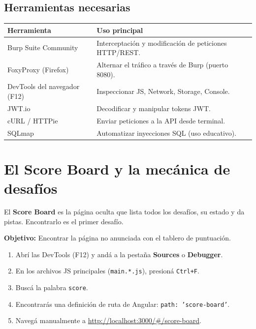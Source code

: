\documentclass[11pt,a4paper]{article}
\begin{document}
\subsection{Herramientas necesarias}
\begin{center}
\renewcommand{\arraystretch}{1.3}
\begin{tabularx}{\textwidth}{@{} p{3.5cm} X @{}}
\toprule
\textbf{Herramienta} & \textbf{Uso principal} \\
\midrule
Burp Suite Community & Interceptación y modificación de peticiones HTTP/REST. \\
FoxyProxy (Firefox) & Alternar el tráfico a través de Burp (puerto 8080). \\
DevTools del navegador (F12) & Inspeccionar JS, Network, Storage, Console. \\
JWT.io & Decodificar y manipular tokens JWT. \\
cURL / HTTPie & Enviar peticiones a la API desde terminal. \\
SQLmap & Automatizar inyecciones SQL (uso educativo). \\
\bottomrule
\end{tabularx}
\end{center}

\section{El Score Board y la mecánica de desafíos}
\label{sec:scoreboard}

El \textbf{Score Board} es la página oculta que lista todos los desafíos, su estado y da pistas. Encontrarlo es el primer desafío.

\begin{desafio}
\textbf{Objetivo:} Encontrar la página no anunciada con el tablero de puntuación.
\begin{solucion}
\begin{enumerate}[leftmargin=*]
  \item Abrí las DevTools (F12) y andá a la pestaña \textbf{Sources} o \textbf{Debugger}.
  \item En los archivos JS principales (\texttt{main.*.js}), presioná \texttt{Ctrl+F}.
  \item Buscá la palabra \texttt{score}.
  \item Encontrarás una definición de ruta de Angular: \texttt{path: 'score-board'}.
  \item Navegá manualmente a \url{http://localhost:3000/#/score-board}.
\end{enumerate}
\end{solucion}
\end{desafio}
\end{document}
